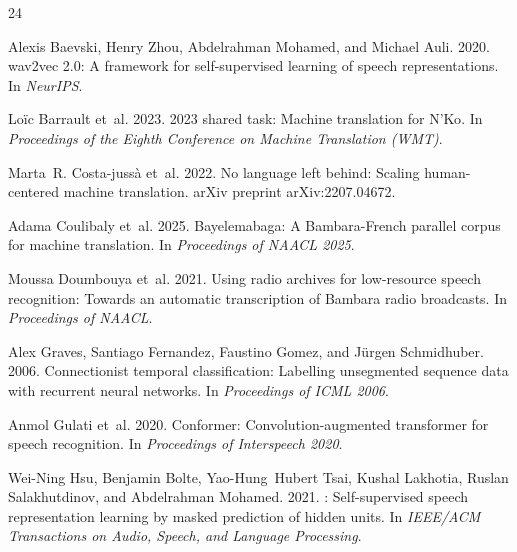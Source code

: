 \documentclass[11pt]{article}
\begin{document}
\begin{thebibliography}{24}
\providecommand{\natexlab}[1]{#1}

Alexis Baevski, Henry Zhou, Abdelrahman Mohamed, and Michael Auli. 2020.
\newblock wav2vec 2.0: A framework for self-supervised learning of speech representations.
\newblock In \emph{NeurIPS}.

Lo\"{i}c Barrault et~al. 2023.
 2023 shared task: Machine translation for {N'Ko}.
\newblock In \emph{Proceedings of the Eighth Conference on Machine Translation (WMT)}.

Marta~R. Costa-juss\`{a} et~al. 2022.
\newblock No language left behind: Scaling human-centered machine translation.
\newblock arXiv preprint arXiv:2207.04672.

Adama Coulibaly et~al. 2025.
\newblock Bayelemabaga: A {Bambara}-{French} parallel corpus for machine translation.
\newblock In \emph{Proceedings of NAACL 2025}.

Moussa Doumbouya et~al. 2021.
\newblock Using radio archives for low-resource speech recognition: Towards an automatic transcription of {Bambara} radio broadcasts.
\newblock In \emph{Proceedings of NAACL}.

Alex Graves, Santiago Fernandez, Faustino Gomez, and J\"{u}rgen Schmidhuber. 2006.
\newblock Connectionist temporal classification: Labelling unsegmented sequence data with recurrent neural networks.
\newblock In \emph{Proceedings of ICML 2006}.

Anmol Gulati et~al. 2020.
\newblock Conformer: Convolution-augmented transformer for speech recognition.
\newblock In \emph{Proceedings of Interspeech 2020}.

Wei-Ning Hsu, Benjamin Bolte, Yao-Hung~Hubert Tsai, Kushal Lakhotia, Ruslan Salakhutdinov, and Abdelrahman Mohamed. 2021.
: Self-supervised speech representation learning by masked prediction of hidden units.
\newblock In \emph{IEEE/ACM Transactions on Audio, Speech, and Language Processing}.


\end{thebibliography}
\end{document}
